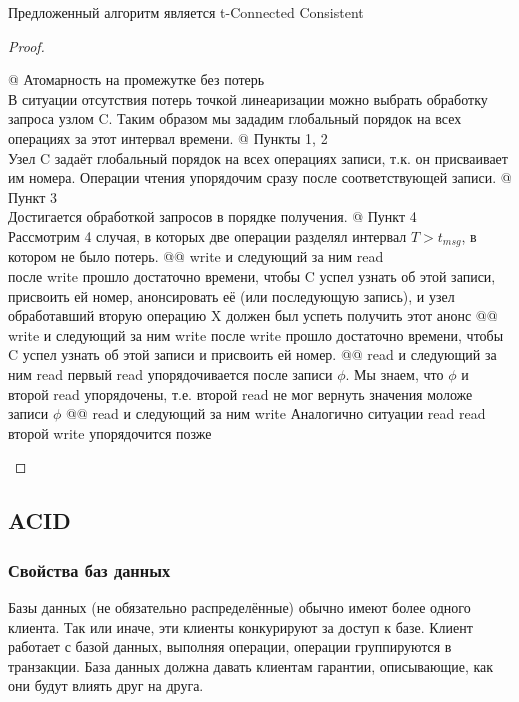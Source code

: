 \begin{tconncons}
\begin{thm}
Предложенный алгоритм является t-Connected Consistent
\end{thm}
\begin{proof}
\begin{el}[ul]
@ Атомарность на промежутке без потерь \\
В ситуации отсутствия потерь точкой линеаризации можно выбрать обработку запроса узлом C. Таким образом мы зададим глобальный порядок на всех операциях за этот интервал времени.
@ Пункты 1, 2 \\
Узел C задаёт глобальный порядок на всех операциях записи, т.к. он
присваивает им номера. Операции чтения упорядочим сразу после
соответствующей записи.
@ Пункт 3 \\
Достигается обработкой запросов в порядке получения.
@ Пункт 4 \\
Рассмотрим 4 случая, в которых две операции разделял интервал $T > t_{msg}$, в котором не было потерь.
@@ write и следующий за ним read\\
после write прошло достаточно времени, чтобы C успел узнать об этой записи, присвоить ей номер, анонсировать её (или последующую запись), и узел обработавший вторую операцию X должен был успеть получить этот анонс
@@ write и следующий за ним write
после write прошло достаточно времени, чтобы C успел узнать об этой записи и присвоить ей номер.
@@ read и следующий за ним read
первый read упорядочивается после записи $\phi$. Мы знаем, что $\phi$ и второй read упорядочены, т.е. второй read не мог вернуть значения моложе записи $\phi$
@@ read и следующий за ним write
Аналогично ситуации read read второй write упорядочится позже
\end{el}
\end{proof}

\end{tconncons}

\subsection{ACID}


\subsubsection{Свойства баз данных}
Базы данных (не обязательно распределённые) обычно имеют более одного клиента. Так или иначе, эти клиенты конкурируют за доступ к базе.
Клиент работает с базой данных, выполняя операции, операции группируются в транзакции. База данных должна давать клиентам гарантии, описывающие, как они будут влиять друг на друга.


